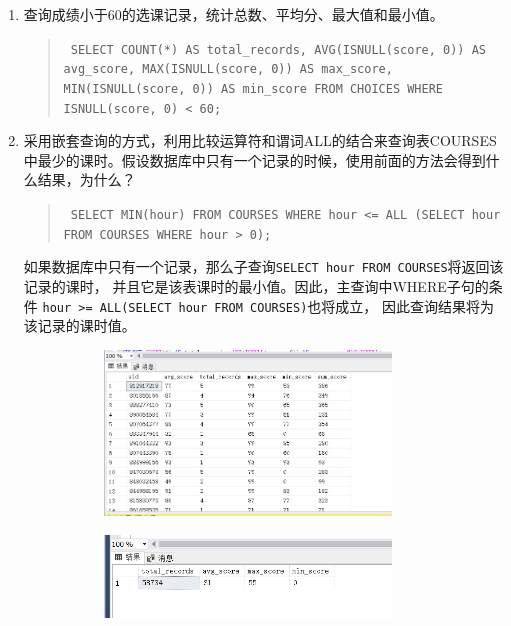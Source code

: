 \documentclass[a4paper,twoside]{article}
\begin{document}
\begin{spacing}{1.2}
\begin{enumerate}
\item 查询成绩小于60的选课记录，统计总数、平均分、最大值和最小值。
\begin{quote}
\texttt{
SELECT COUNT(*) AS total\_records, AVG(ISNULL(score, 0)) AS avg\_score, MAX(ISNULL(score, 0)) AS max\_score, MIN(ISNULL(score, 0)) AS min\_score
FROM CHOICES
WHERE ISNULL(score, 0) < 60;
}
\end{quote}

\item 采用嵌套查询的方式，利用比较运算符和谓词ALL的结合来查询表COURSES中最少的课时。假设数据库中只有一个记录的时候，使用前面的方法会得到什么结果，为什么？
\begin{quote}
\texttt{
SELECT MIN(hour) FROM COURSES WHERE hour <= ALL (SELECT hour FROM COURSES WHERE hour > 0);
}
\end{quote}

如果数据库中只有一个记录，那么子查询\texttt{SELECT hour FROM COURSES}将返回该记录的课时，
并且它是该表课时的最小值。因此，主查询中WHERE子句的条件
\texttt{hour >= ALL(SELECT hour FROM COURSES)}也将成立，
因此查询结果将为该记录的课时值。


\begin{figure}[h]
\centering
\caption{运行结果}
\begin{subfigure}{0.3\textwidth}
  \includegraphics[width=0.9\textwidth]{fig34.png}
\end{subfigure}
\begin{subfigure}{0.3\textwidth}
  \includegraphics[width=0.9\textwidth]{fig35.png}
\end{subfigure}
\end{figure}


\end{enumerate}
\end{spacing}
\end{document}
